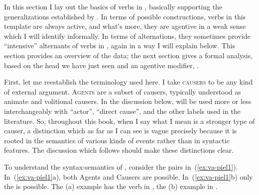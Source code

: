 \begin{exe}
\begin{xlist}
\begin{exe}
\begin{xlist}
\begin{exe}
\begin{xlist}
\begin{exe}
\begin{exe}
\begin{xlist}
\begin{exe}
\begin{xlist}
\begin{exe}
\begin{xlist}
\begin{exe}
\begin{xlist}
\begin{exe}
\begin{xlist}
\begin{exe}
\begin{xlist}
\begin{exe}
\begin{xlist}
\begin{exe}
\begin{xlist}
\begin{exe}
\begin{xlist}
\begin{exe}
\begin{xlist}
\begin{exe}
\begin{xlist}
\begin{exe}
\begin{xlist}
\begin{exe}
\begin{xlist}
\begin{exe}
\begin{exe}
\begin{xlist}
\begin{exe}
\begin{xlist}
\begin{exe}
\begin{xlist}
\begin{exe}
\begin{xlist}
\begin{exe}
\begin{xlist}
\begin{exe}
\begin{xlist}
\begin{exe}
\begin{xlist}
\begin{exe}
\begin{xlist}
\begin{xlist}
\begin{xlist}
\begin{exe}
\begin{xlist}
\begin{xlist}
\begin{xlist}
\begin{exe}
\begin{exe}
\begin{xlist}
In this section I lay out the basics of verbs in {\tpie}, basically supporting the generalizations established by \cite{doron03}. In terms of possible constructions, verbs in this template are always active, and what's more, they are agentive in a weak sense which I will identify informally. In terms of alternations, they sometimes provide ``intensive'' alternants of verbs in {\tkal}, again in a way I will explain below. This section provides an overview of the data; the next section gives a formal analysis, based on the head  we have just seen and an agentive modifier, {\va}.

First, let me reestablish the terminology used here. I take \textsc{causers} to be any kind of external argument. \textsc{Agents} are a subset of causers, typically understood as animate and volitional causers. In the discussion below, \textsc{} will be used more or less interchangeably with ``actor'', ``direct cause'', and the other labels used in the literature. So, throughout this book, when I say \textsc{} what I mean is a stronger type of causer, a distinction which as far as I can see is vague precisely because it is rooted in the semantics of various kinds of events rather than in syntactic features. The discussion which follows should make these distinctions clear.

To understand the syntax-semantics of {\tpie}, consider the pairs in~(\ref{ex:va-piel1}). In~(\ref{ex:va-piel1}a), both Agents and Causers are possible. In~(\ref{ex:va-piel1}b) only the  is possible. The (a) example has the verb in {\tkal}, the (b) example in {\tpie}.


\end{xlist}
\end{exe}
\end{exe}
\end{xlist}
\end{xlist}
\end{xlist}
\end{exe}
\end{xlist}
\end{xlist}
\end{xlist}
\end{exe}
\end{xlist}
\end{exe}
\end{xlist}
\end{exe}
\end{xlist}
\end{exe}
\end{xlist}
\end{exe}
\end{xlist}
\end{exe}
\end{xlist}
\end{exe}
\end{xlist}
\end{exe}
\end{exe}
\end{xlist}
\end{exe}
\end{xlist}
\end{exe}
\end{xlist}
\end{exe}
\end{xlist}
\end{exe}
\end{xlist}
\end{exe}
\end{xlist}
\end{exe}
\end{xlist}
\end{exe}
\end{xlist}
\end{exe}
\end{xlist}
\end{exe}
\end{xlist}
\end{exe}
\end{xlist}
\end{exe}
\end{xlist}
\end{exe}
\end{xlist}
\end{exe}
\end{exe}
\end{xlist}
\end{exe}
\end{xlist}
\end{exe}
\end{xlist}
\end{exe}
